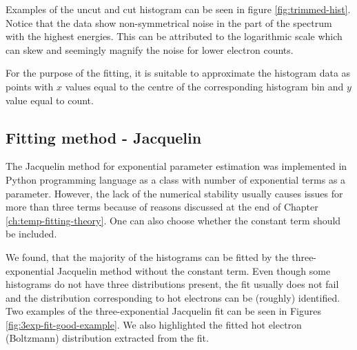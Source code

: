 Examples of the uncut and cut histogram can be seen in figure \ref{fig:trimmed-hist}. Notice that the data show non-symmetrical noise in the part of the spectrum with the highest energies. This can be attributed to the logarithmic scale which can skew and seemingly magnify the noise for lower electron counts. 

For the purpose of the fitting, it is suitable to approximate the histogram data as points with $x$ values equal to the centre of the corresponding histogram bin and $y$ value equal to count.

\subsection*{Fitting method - Jacquelin}

The Jacquelin method for exponential parameter estimation was implemented in Python programming language as a class with number of exponential terms as a parameter. However, the lack of the numerical stability usually causes issues for more than three terms because of reasons discussed at the end of Chapter \ref{ch:temp-fitting-theory}. One can also choose whether the constant term should be included.

We found, that the majority of the histograms can be fitted by the three-exponential Jacquelin method without the constant term. Even though some histograms do not have three distributions present, the fit usually does not fail and the distribution corresponding to hot electrons can be (roughly) identified. Two examples of the three-exponential Jacquelin fit can be seen in Figures \ref{fig:3exp-fit-good-example}. We also highlighted the fitted hot electron (Boltzmann) distribution extracted from the fit.

